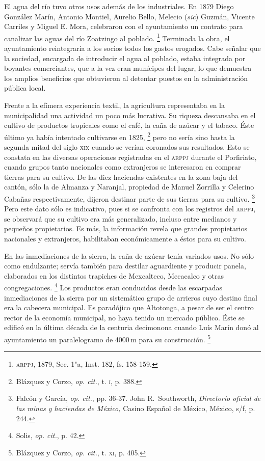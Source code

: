 \documentclass[14pt,twoside,final]{extbook} %
\let\oldfootnote\footnote
\renewcommand\footnote[1]{%
\oldfootnote{\hspace{1mm}#1}}
\begin{document}
El agua del río tuvo otros usos además de los industriales. En 1879 Diego González Marín, Antonio Montiel, Aurelio Bello, Melecio (\emph{sic}) Guzmán, Vicente Carriles y Miguel E. Mora, celebraron con el ayuntamiento un contrato para canalizar las aguas del río Zoatzingo al poblado.\footnote{\textsc{arppj}, 1879, Sec. 1"a, Inst. 182, fs. 158-159.} Terminada la obra, el ayuntamiento reintegraría a los socios todos los gastos erogados. Cabe señalar que la sociedad, encargada de introducir el agua al poblado, estaba integrada por boyantes comerciantes, que a la vez eran munícipes del lugar, lo que demuestra los amplios beneficios que obtuvieron al detentar puestos en la administración pública local.

Frente a la efímera experiencia textil, la agricultura representaba en la municipalidad una actividad un poco más lucrativa. Su riqueza descansaba en el cultivo de productos tropicales como el café, la caña de azúcar y el tabaco. Éste último ya había intentado cultivarse en 1825,\footnote{Blázquez y Corzo, \emph{op. cit.}, t. \textsc{i}, p. 388.} pero no sería sino hasta la segunda mitad del siglo \textsc{xix} cuando se verían coronados sus resultados. Esto se constata en las diversas operaciones registradas en el \textsc{arppj} durante el Porfiriato, cuando grupos tanto nacionales como extranjeros se interesaron en comprar tierras para su cultivo. De las diez haciendas
existentes en la zona baja del cantón, sólo la de Almanza y Naranjal, propiedad de Manuel Zorrilla y Celerino Cabañas respectivamente, dijeron destinar parte de sus tierras para su cultivo.\footnote{Falcón y García, \emph{op. cit.}, pp. 36-37. John R.~Southworth, \emph{Directorio oficial de las minas y haciendas de México,} Casino Español de México, México, s/f, p. 244.} Pero este dato sólo es indicativo, pues si se confronta con los registros del \textsc{arppj}, se observará que su cultivo era más generalizado, incluso entre medianos y pequeños propietarios. Es más, la información revela que grandes propietarios nacionales y extranjeros, habilitaban económicamente a éstos para su cultivo.

En las inmediaciones de la sierra, la caña de azúcar tenía variados usos. No sólo como endulzante; servía también para destilar aguardiente y producir panela, elaborados en los distintos trapiches de Mexcalteco, Mecacalco y otras congregaciones.\footnote{Solis, \emph{op. cit.}, p. 42.} Los productos eran conducidos desde las escarpadas inmediaciones de la sierra por un sistemático grupo de arrieros cuyo destino final era la cabecera municipal. Es paradójico que Altotonga, a pesar de ser el centro rector de la economía municipal, no haya tenido un mercado público. Éste se edificó en la última década de la centuria decimonona cuando Luís Marín donó al ayuntamiento un paralelogramo de 4000\,m para su construcción.\footnote{Blázquez y Corzo, \emph{op. cit.}, t. \textsc{xi}, p. 405.}
\end{document}
